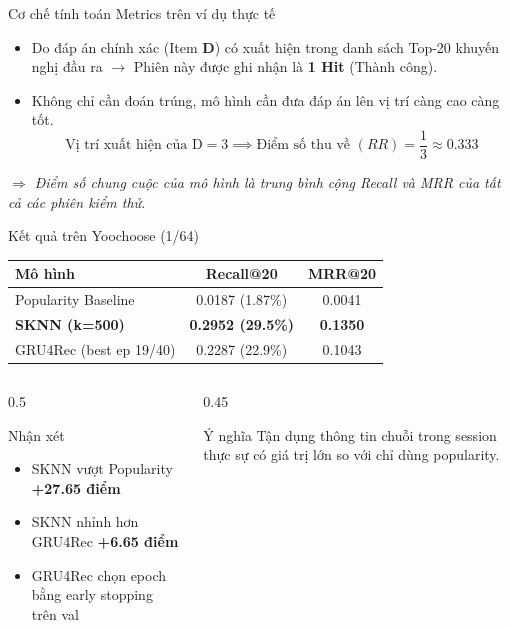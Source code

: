 \documentclass[aspectratio=169, 11pt]{beamer}
\begin{document}
\begin{frame}{Cơ chế tính toán Metrics trên ví dụ thực tế}

    \begin{itemize}
        \item \textbf{\color{green!60!black}{Recall@20 (Độ phủ):}} Do đáp án chính xác (Item \textbf{D}) có xuất hiện trong danh sách Top-20 khuyến nghị đầu ra $\rightarrow$ Phiên này được ghi nhận là \textbf{1 Hit} (Thành công).

        \item \textbf{\color{orange!80!black}{MRR@20 (Thứ hạng nghịch đảo):}} Không chỉ cần đoán trúng, mô hình cần đưa đáp án lên vị trí càng cao càng tốt.
        $$\text{Vị trí xuất hiện của D} = 3 \implies \text{Điểm số thu về } (RR) = \frac{1}{3} \approx 0.333$$
    \end{itemize}

    \vspace{0.05cm}
    \begin{center}
        \footnotesize\color{gray}
        \textit{$\Rightarrow$ Điểm số chung cuộc của mô hình là trung bình cộng Recall và MRR của tất cả các phiên kiểm thử.}
    \end{center}
\end{frame}

\begin{frame}{Kết quả trên Yoochoose (1/64)}
\begin{table}
\centering
\large
\begin{tabular}{lcc}
\toprule
\textbf{Mô hình} & \textbf{Recall@20} & \textbf{MRR@20} \\
\midrule
Popularity Baseline & 0.0187 (1.87\%) & 0.0041 \\
\textbf{SKNN (k=500)} & \textbf{0.2952 (29.5\%)} & \textbf{0.1350} \\
GRU4Rec (best ep 19/40) & 0.2287 (22.9\%) & 0.1043 \\
\bottomrule
\end{tabular}
\end{table}

\vspace{0.5cm}
\begin{columns}
\begin{column}{0.5\textwidth}
\begin{exampleblock}{Nhận xét}
\begin{itemize}
    \item SKNN vượt Popularity \textbf{+27.65 điểm}
    \item SKNN nhỉnh hơn GRU4Rec \textbf{+6.65 điểm}
    \item GRU4Rec chọn epoch bằng early stopping trên val
\end{itemize}
\end{exampleblock}
\end{column}
\begin{column}{0.45\textwidth}
\begin{alertblock}{Ý nghĩa}
Tận dụng thông tin chuỗi trong session thực sự có giá trị lớn so với chỉ dùng popularity.
\end{alertblock}
\end{column}
\end{columns}
\end{frame}
\end{document}
